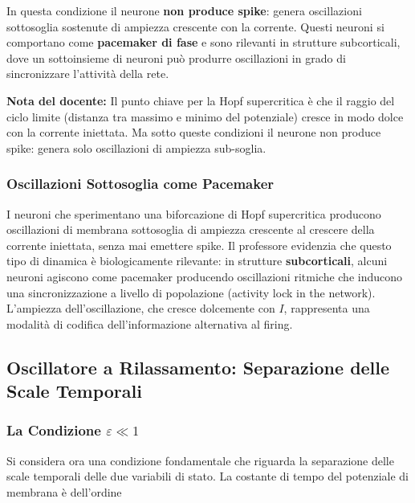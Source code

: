 In questa condizione il neurone \textbf{non produce spike}: genera oscillazioni sottosoglia sostenute di ampiezza crescente con la corrente. Questi neuroni si comportano come \textbf{pacemaker di fase} e sono rilevanti in strutture subcorticali, dove un sottoinsieme di neuroni può produrre oscillazioni in grado di sincronizzare l'attività della rete.

\begin{tcolorbox}[colback=gray!5, colframe=gray!40, arc=2mm, boxrule=0.5pt]
\textbf{Nota del docente:} Il punto chiave per la Hopf supercritica è che il raggio del ciclo limite (distanza tra massimo e minimo del potenziale) cresce in modo dolce con la corrente iniettata. Ma sotto queste condizioni il neurone non produce spike: genera solo oscillazioni di ampiezza sub-soglia.
\end{tcolorbox}


\subsubsection{Oscillazioni Sottosoglia come Pacemaker}

I neuroni che sperimentano una biforcazione di Hopf supercritica producono oscillazioni di membrana sottosoglia di ampiezza crescente al crescere della corrente iniettata, senza mai emettere spike. Il professore evidenzia che questo tipo di dinamica è biologicamente rilevante: in strutture \textbf{subcorticali}, alcuni neuroni agiscono come pacemaker producendo oscillazioni ritmiche che inducono una sincronizzazione a livello di popolazione (activity lock in the network). L'ampiezza dell'oscillazione, che cresce dolcemente con $I$, rappresenta una modalità di codifica dell'informazione alternativa al firing.



\subsection{Oscillatore a Rilassamento: Separazione delle Scale Temporali}

\subsubsection{La Condizione $\varepsilon \ll 1$}

Si considera ora una condizione fondamentale che riguarda la separazione delle scale temporali delle due variabili di stato. La costante di tempo del potenziale di membrana è dell'ordine

